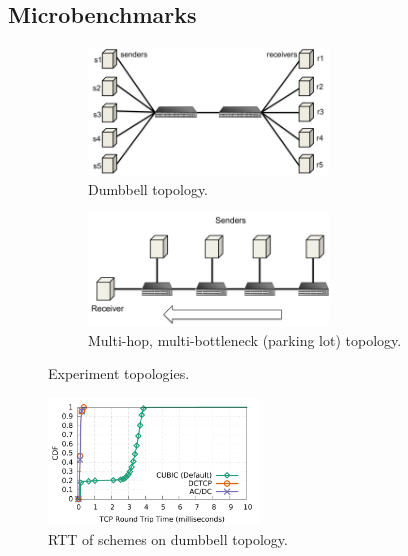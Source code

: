 \subsection{Microbenchmarks}
\label{micro}
\begin{figure}[!t]
        \centering
        \begin{subfigure}[b]{0.45\textwidth}
                \centering
                \includegraphics[width=0.7\textwidth]{acdctcp/figures/dumbbell_topology.pdf}
                \caption{Dumbbell topology.}
                \label{dumbbell_topology}
        \end{subfigure}
        \begin{subfigure}[b]{0.45\textwidth}
                \centering
                \includegraphics[width=0.7\textwidth]{acdctcp/figures/parkinglot_topology.pdf}
                \caption{Multi-hop, multi-bottleneck (parking lot) topology.}
                \label{parkinglot_topology}
        \end{subfigure}
        \caption{Experiment topologies.}
        \label{microbenchmarks_topology}
\end{figure}


\begin{figure}[!t]
        \centering
  \includegraphics[width=0.5\textwidth]{acdctcp/figures/convergence/flowcontrolOFF_sockperf/convergence_test_sockperf.pdf}
        \caption{RTT of schemes on dumbbell topology.}
        \label{sockperf_convergence}
\end{figure}

